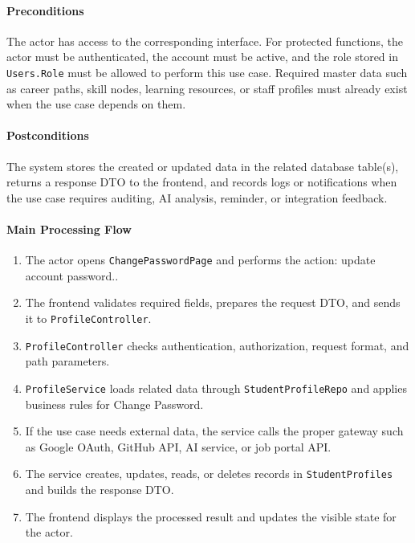 \paragraph{Preconditions}

The actor has access to the corresponding interface. For protected functions, the actor must be authenticated, the account must be active, and the role stored in \texttt{Users.Role} must be allowed to perform this use case. Required master data such as career paths, skill nodes, learning resources, or staff profiles must already exist when the use case depends on them.

\paragraph{Postconditions}

The system stores the created or updated data in the related database table(s), returns a response DTO to the frontend, and records logs or notifications when the use case requires auditing, AI analysis, reminder, or integration feedback.

\paragraph{Main Processing Flow}

\begin{enumerate}
    \item The actor opens \texttt{ChangePasswordPage} and performs the action: update account password..
    \item The frontend validates required fields, prepares the request DTO, and sends it to \texttt{ProfileController}.
    \item \texttt{ProfileController} checks authentication, authorization, request format, and path parameters.
    \item \texttt{ProfileService} loads related data through \texttt{StudentProfileRepo} and applies business rules for Change Password.
    \item If the use case needs external data, the service calls the proper gateway such as Google OAuth, GitHub API, AI service, or job portal API.
    \item The service creates, updates, reads, or deletes records in \texttt{StudentProfiles} and builds the response DTO.
    \item The frontend displays the processed result and updates the visible state for the actor.
\end{enumerate}

